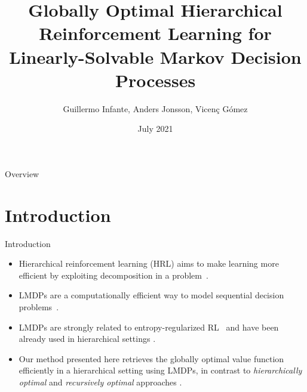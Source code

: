 \documentclass{beamer}
\title[Globally Optimal HRL for LMDPs]{Globally Optimal Hierarchical Reinforcement Learning for Linearly-Solvable Markov Decision Processes}
\author[G. Infante, A. Jonsson, V. Gómez ]{Guillermo Infante, Anders Jonsson, Vicenç Gómez }
\date[July 2021]{July 2021}
\theoremstyle{mystyle}
\begin{document}
\begin{frame}
   \maketitle
\end{frame}

\begin{frame}{Overview}
\tableofcontents
\end{frame}

\section{Introduction}

\begin{frame}{Introduction}

\begin{itemize}
    \item Hierarchical reinforcement learning (HRL) aims to make learning more efficient by exploiting decomposition in a problem~\cite{conf/nips/Wen20}.
    \item LMDPs are a computationally efficient way to model sequential decision problems~\citep{TodorovNIPS2007}.
    \item LMDPs are strongly related to entropy-regularized RL~\cite{optionkeyb} and have been already used in hierarchical settings \cite{saxe2017hierarchy, conf/icaps/Jonsson16}.
    \item Our method presented here retrieves the globally optimal value function efficiently in a hierarchical setting using LMDPs, in contrast to \textit{hierarchically optimal} and \textit{recursively optimal} approaches \cite{dietterich2000hierarchical}.
\end{itemize}
    
\end{frame}
\end{document}
